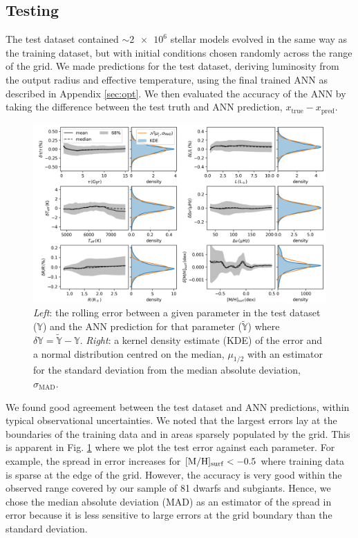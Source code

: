 \subsection{Testing}\label{sec:test}



The test dataset contained $\sim \num{2e6}$ stellar models evolved in the same way as the training dataset, but with initial conditions chosen randomly across the range of the grid. We made predictions for the test dataset, deriving luminosity from the output radius and effective temperature, using the final trained ANN as described in Appendix \ref{sec:opt}. We then evaluated the accuracy of the ANN by taking the difference between the test truth and ANN prediction, $x_\mathrm{true} - x_\mathrm{pred}$. 

\begin{figure}[tb]
    \centering
    \includegraphics[width=\linewidth]{figures/test_random_wide.png}
    \caption[The error between a given parameter in the test dataset and the ANN prediction for that parameter.]{\emph{Left}: the rolling error between a given parameter in the test dataset ($\mathbb{Y}$) and the ANN prediction for that parameter ($\widetilde{\mathbb{Y}}$) where $\delta \mathbb{Y} = \widetilde{\mathbb{Y}} - \mathbb{Y}$. \emph{Right}: a kernel density estimate (KDE) of the error and a normal distribution centred on the median, $\mu_{1/2}$ with an estimator for the standard deviation from the median absolute deviation, $\sigma_\mathrm{MAD}$.}
    \label{fig:test}
\end{figure}

We found good agreement between the test dataset and ANN predictions, within typical observational uncertainties. We noted that the largest errors lay at the boundaries of the training data and in areas sparsely populated by the grid. This is apparent in Fig. \ref{fig:test} where we plot the test error against each parameter. For example, the spread in error increases for $[\mathrm{M}/\mathrm{H}]_\mathrm{surf} < -0.5$ where training data is sparse at the edge of the grid. However, the accuracy is very good within the observed range covered by our sample of 81 dwarfs and subgiants. Hence, we chose the median absolute deviation (MAD) as an estimator of the spread in error because it is less sensitive to large errors at the grid boundary than the standard deviation.

